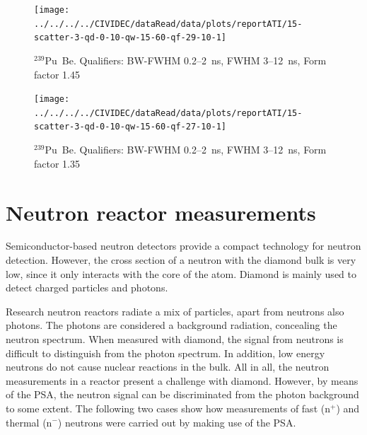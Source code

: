 \documentclass[12pt]{packages/mytustyle}  %
\begin{document}
\clearpage
\begin{figure}[!t]
\centering
\texttt{[image: ../../../../CIVIDEC/dataRead/data/plots/reportATI/15-scatter-3-qd-0-10-qw-15-60-qf-29-10-1]}
\caption{$^{239}$Pu~Be. Qualifiers: BW-FWHM 0.2--2~ns, FWHM 3--12~ns, Form factor 1.45}
\label{fig:scatterpuq2}
\end{figure}

\clearpage
\begin{figure}[!t]
\centering
\texttt{[image: ../../../../CIVIDEC/dataRead/data/plots/reportATI/15-scatter-3-qd-0-10-qw-15-60-qf-27-10-1]}
\caption{$^{239}$Pu~Be. Qualifiers: BW-FWHM 0.2--2~ns, FWHM 3--12~ns, Form factor 1.35}
\label{fig:scatterpuq3}
\end{figure}


























\clearpage
\section{Neutron reactor measurements}
\label{sec:nm}
Semiconductor-based neutron detectors provide a compact technology for neutron detection. However, the cross section of a neutron with the diamond bulk is very low, since it only interacts with the core of the atom. Diamond is mainly used to detect charged particles and photons. 

Research neutron reactors radiate a mix of particles, apart from neutrons also photons. The photons are considered a background radiation, concealing the neutron spectrum. When measured with diamond, the signal from neutrons is difficult to distinguish from the photon spectrum. In addition, low energy neutrons do not cause nuclear reactions in the bulk. All in all, the neutron measurements in a reactor present a challenge with diamond. However, by means of the PSA, the neutron signal can be discriminated from the photon background to some extent. The following two cases show how measurements of fast (n$^+$) and thermal (n$^-$) neutrons were carried out by making use of the PSA.
\end{document}
